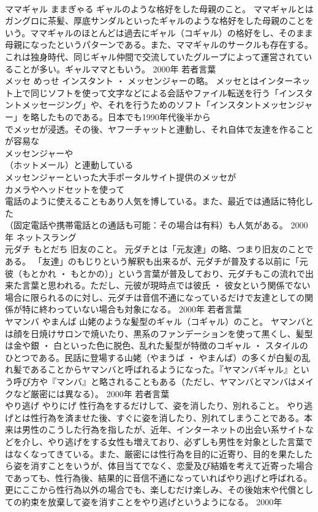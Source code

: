 \documentclass[8pt]{extreport}
\begin{document}
\begin{CJK}{UTF8}{min}
\\	ママギャル	ままぎゃる	ギャルのような格好をした母親のこと。	ママギャルとはガングロに茶髪、厚底サンダルといったギャルのような格好をした母親のことをいう。ママギャルのほとんどは過去にギャル（コギャル）の格好をし、そのまま母親になったというパターンである。また、ママギャルのサークルも存在する。これは独身時代、同じギャル仲間で交流していたグループによって運営されていることが多い。ギャルママともいう。	2000年	若者言葉	
\\	メッセ	めっせ	インスタント ・ メッセンジャーの略。	メッセとはインターネット上で同じソフトを使って文字などによる会話やファイル転送を行う「インスタントメッセージング」や、それを行うためのソフト「インスタントメッセンジャー」を略したものである。日本でも1990年代後半から
\\	でメッセが浸透。その後、ヤフーチャットと連動し、それ自体で友達を作ることが容易な
\\	メッセンジャーや
\\	（ホットメール）と連動している
\\	メッセンジャーといった大手ポータルサイト提供のメッセが
\\	カメラやヘッドセットを使って
\\	電話のように使えることもあり人気を博している。また、最近では通話に特化した
\\	（固定電話や携帯電話との通話も可能：その場合は有料）も人気がある。	2000年	ネットスラング	
\\	元ダチ	もとだち	旧友のこと。	元ダチとは「元友達」の略、つまり旧友のことである。 「友達」のもじりという解釈も出来るが、元ダチが普及する以前に「元彼（もとかれ ・ もとかの）」という言葉が普及しており、元ダチもこの流れで出来た言葉と思われる。ただし、元彼が現時点では彼氏 ・ 彼女という関係でない場合に限られるのに対し、元ダチは音信不通になっているだけで友達としての関係が特に終わっていない場合も対象になる。	2000年	若者言葉	
\\	ヤマンバ	やまんば	山姥のような髪型のギャル（コギャル）のこと。	ヤマンバとは顔を日焼けサロンで焼いたり、黒系のファンデーションを使って黒くし、髪型は金や銀 ・ 白といった色に脱色、乱れた髪型が特徴のコギャル ・ スタイルのひとつである。民話に登場する山姥（やまうば ・ やまんば）の多くが白髪の乱れ髪であることからヤマンバと呼ばれるようになった。『ヤマンバギャル』という呼び方や『マンバ』と略されることもある（ただし、ヤマンバとマンバはメイクなど厳密には異なる）。	2000年	若者言葉	
\\	やり逃げ	やりにげ	性行為をするだけして、姿を消したり、別れること。	やり逃げとは性行為を済ませた後、すぐに姿を消したり、別れてしまうことである。本来は男性のこうした行為を指したが、近年、インターネットの出会い系サイトなどを介し、やり逃げをする女性も増えており、必ずしも男性を対象とした言葉ではなくなってきている。また、厳密には性行為を目的に近寄り、目的を果たしたら姿を消すことをいうが、体目当てでなく、恋愛及び結婚を考えて近寄った場合であっても、性行為後、結果的に音信不通になっていればやり逃げと呼ばれる。 更にここから性行為以外の場合でも、楽しむだけ楽しみ、その後始末や代償としての約束を放棄して姿を消すことをやり逃げというようになる。	2000年	

\end{CJK}
\end{document}
